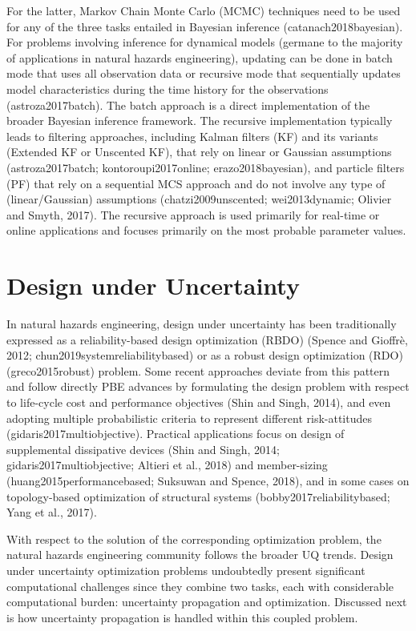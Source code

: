 For the latter, Markov Chain Monte Carlo (MCMC) techniques need to be used for any of the three tasks entailed in Bayesian inference (catanach2018bayesian). For problems involving inference for dynamical models (germane to the majority of applications in natural hazards engineering), updating can be done in batch mode that uses all observation data or recursive mode that sequentially updates model characteristics during the time history for the observations (astroza2017batch). The batch approach is a direct implementation of the broader Bayesian inference framework. The recursive implementation typically leads to filtering approaches, including Kalman filters (KF) and its variants (Extended KF or Unscented KF), that rely on linear or Gaussian assumptions (astroza2017batch; kontoroupi2017online; erazo2018bayesian), and particle filters (PF) that rely on a sequential MCS approach and do not involve any type of (linear/Gaussian) assumptions (chatzi2009unscented; wei2013dynamic; Olivier and Smyth, 2017). The recursive approach is used primarily for real-time or online applications and focuses primarily on the most probable parameter values. 

\section{Design under Uncertainty}
\label{sec:uq_design}

In natural hazards engineering, design under uncertainty has been traditionally expressed as a reliability-based design optimization (RBDO) (Spence and Gioffrè, 2012; chun2019systemreliabilitybased) or as a robust design optimization (RDO) (greco2015robust) problem. Some recent approaches deviate from this pattern and follow directly PBE advances by formulating the design problem with respect to life-cycle cost and performance objectives (Shin and Singh, 2014), and even adopting multiple probabilistic criteria to represent different risk-attitudes (gidaris2017multiobjective). Practical applications focus on design of supplemental dissipative devices (Shin and Singh, 2014; gidaris2017multiobjective; Altieri et al., 2018) and member-sizing (huang2015performancebased; Suksuwan and Spence, 2018), and in some cases on topology-based optimization of structural systems (bobby2017reliabilitybased; Yang et al., 2017).

With respect to the solution of the corresponding optimization problem, the natural hazards engineering community follows the broader UQ trends. Design under uncertainty optimization problems undoubtedly present significant computational challenges since they combine two tasks, each with considerable computational burden: uncertainty propagation and optimization. Discussed next is how uncertainty propagation is handled within this coupled problem.

